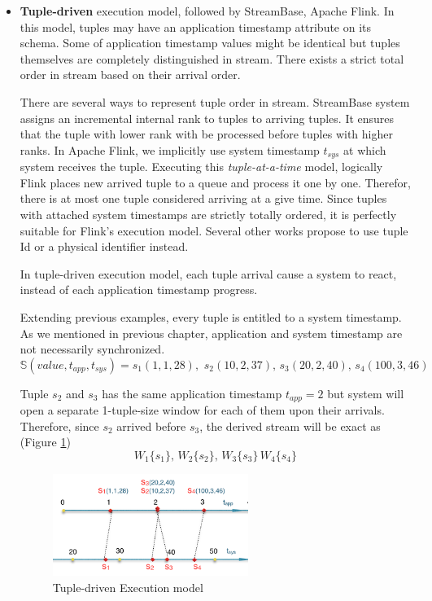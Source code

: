 \begin{itemize}
	\item \textbf{Tuple-driven} execution model, followed by StreamBase, Apache Flink. In this model, tuples may have an application timestamp attribute on its schema. Some of application timestamp values might be identical but tuples themselves are completely distinguished in stream. There exists a strict total order in stream based on their arrival order. 
	
	There are several ways to represent tuple order in stream. StreamBase system assigns an incremental internal rank to tuples to arriving tuples. It ensures that the tuple with lower rank with be processed before tuples with higher ranks. In Apache Flink, we implicitly use system timestamp   $t_{sys}$ at which system receives the tuple. Executing this \textit{tuple-at-a-time} model, logically Flink places new arrived tuple to a queue and process it one by one. Therefor, there is at most one tuple  considered arriving at a give time.  Since tuples with attached system timestamps are strictly totally ordered, it is perfectly suitable for Flink's execution model. Several other works propose to use tuple Id \citep{Dindar:2013} or a physical identifier\citep{Petit:2010} instead. 	
	
	In tuple-driven execution model, each tuple arrival cause a system to react, instead of each application timestamp progress. 
	
	Extending previous examples, every tuple is entitled to a system timestamp. As we mentioned in previous chapter, application and system timestamp are not necessarily synchronized.
	\begin{equation}
			\mathbb{S}(value, t_{app}, t_{sys}) = s_1(1,1,28),\,\,s_2(10,2,37),\,s_3(20,2,40),\, s_4(100,3,46)
	\end{equation}
	
	Tuple $s_2$ and $s_3$ has the same application timestamp $t_{app} = 2$ but system will open a separate 1-tuple-size window for each of them upon their arrivals. Therefore, since $s_2$ arrived before $s_3$, the derived stream will be exact as (Figure \ref{fig:tuple-driven})
	\begin{equation}
W_1\{s_1\},\, W_2\{s_2\},\, W_3\{s_3\}\,W_4\{s_4\}
\end{equation}
	
	\begin{figure}[htbp!] 
\centering    
\includegraphics[width=0.6\textwidth]{tuple-driven}
\caption{Tuple-driven Execution model}
\label{fig:tuple-driven}
\end{figure}
	

\end{itemize}
